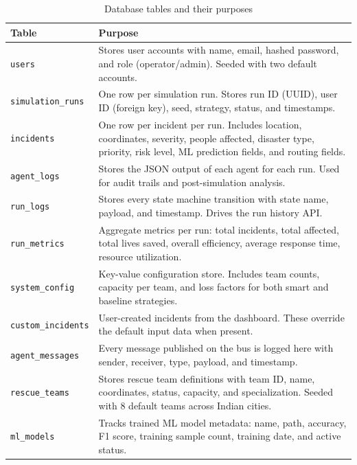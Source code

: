 \begin{table}[H]
\centering
\caption{Database tables and their purposes}
\label{tab:db_tables}
\begin{tabularx}{\textwidth}{|l|X|}
\hline
\textbf{Table} & \textbf{Purpose} \\
\hline
\texttt{users} & Stores user accounts with name, email, hashed password, and role (operator/admin). Seeded with two default accounts. \\
\hline
\texttt{simulation\_runs} & One row per simulation run. Stores run ID (UUID), user ID (foreign key), seed, strategy, status, and timestamps. \\
\hline
\texttt{incidents} & One row per incident per run. Includes location, coordinates, severity, people affected, disaster type, priority, risk level, ML prediction fields, and routing fields. \\
\hline
\texttt{agent\_logs} & Stores the JSON output of each agent for each run. Used for audit trails and post-simulation analysis. \\
\hline
\texttt{run\_logs} & Stores every state machine transition with state name, payload, and timestamp. Drives the run history API. \\
\hline
\texttt{run\_metrics} & Aggregate metrics per run: total incidents, total affected, total lives saved, overall efficiency, average response time, resource utilization. \\
\hline
\texttt{system\_config} & Key-value configuration store. Includes team counts, capacity per team, and loss factors for both smart and baseline strategies. \\
\hline
\texttt{custom\_incidents} & User-created incidents from the dashboard. These override the default input data when present. \\
\hline
\texttt{agent\_messages} & Every message published on the bus is logged here with sender, receiver, type, payload, and timestamp. \\
\hline
\texttt{rescue\_teams} & Stores rescue team definitions with team ID, name, coordinates, status, capacity, and specialization. Seeded with 8 default teams across Indian cities. \\
\hline
\texttt{ml\_models} & Tracks trained ML model metadata: name, path, accuracy, F1 score, training sample count, training date, and active status. \\
\hline
\end{tabularx}
\end{table}

